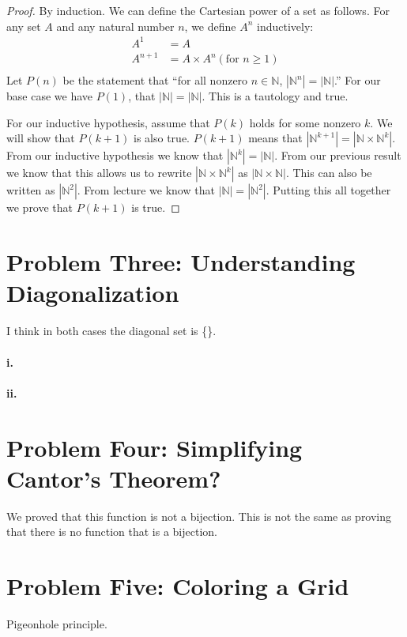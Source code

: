 \documentclass[10pt,letter]{article}
\begin{document}
\begin{proof} By induction. We can define the Cartesian power of a set as follows. For any set $A$ and any natural number $n$, we define $A^n$ inductively:
\begin{align*}
A^1 &= A \\
A^{n+1} &= A \times A^n (\text{for } n \ge 1)\\
\end{align*}
Let $P(n)$ be the statement that ``for all nonzero $n \in \mathbb{N}$, $|\mathbb{N}^n| = |\mathbb{N}|$.'' For our base case we have $P(1)$, that $|\mathbb{N}| = |\mathbb{N}|$. This is a tautology and true.

For our inductive hypothesis, assume that $P(k)$ holds for some nonzero $k$. We will show that $P(k+1)$ is also true. $P(k+1)$ means that $|\mathbb{N}^{k+1}| = |\mathbb{N} \times \mathbb{N}^k|$. From our inductive hypothesis we know that $|\mathbb{N}^k| = |\mathbb{N}|$. From our previous result we know that this allows us to rewrite $|\mathbb{N} \times \mathbb{N}^k|$ as $|\mathbb{N} \times \mathbb{N}|$. This can also be written as $|\mathbb{N}^2|$. From lecture we know that $|\mathbb{N}| = |\mathbb{N}^2|$. Putting this all together we prove that $P(k+1)$ is true.
\end{proof}

\section*{Problem Three: Understanding Diagonalization}
I think in both cases the diagonal set is \{\}.

\paragraph{i.} 
\paragraph{ii.}

\section*{Problem Four: Simplifying Cantor's Theorem?}
We proved that this function is not a bijection. This is not the same as proving that there is no function that is a bijection. 

\section*{Problem Five: Coloring a Grid}
Pigeonhole principle.
\end{document}
